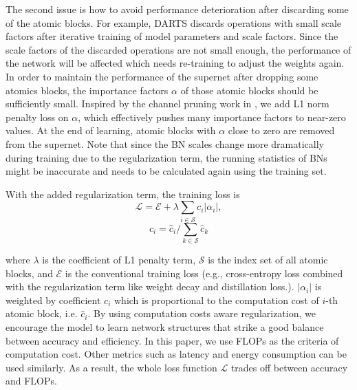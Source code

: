 \documentclass{article} \usepackage{iclr2020_conference,times}
\newcommand{\flops}{FLOPs\xspace}
\begin{document}
The second issue is how to avoid performance deterioration after discarding some of the atomic blocks. For example, DARTS discards operations with small scale factors after iterative training of model parameters and scale factors. Since the scale factors of the discarded operations are not small enough, the performance of the network will be affected which needs re-training to adjust the weights again. In order to maintain the performance of the supernet after dropping some atomics blocks, the importance factors $\alpha$ of those atomic blocks should be sufficiently small. Inspired by the channel pruning work in \cite{zhuang2017slimming}, we add L1 norm penalty loss on $\alpha$, which effectively pushes many importance factors to near-zero values. At the end of learning, atomic blocks with $\alpha$ close to zero are removed from the supernet. Note that since the BN scales change more dramatically during training due to the regularization term, the running statistics of BNs might be inaccurate and needs to be calculated again using the training set.

With the added regularization term, the training loss is
\begin{equation}
    \mathcal{L} = \mathcal{E} + \lambda \sum_{i\in\mathcal{S}} c_i |\alpha_i|, \label{eq:sparsity}
\end{equation}
\begin{equation}
    c_i = \hat{c}_i / \sum_{k \in \mathcal{S}} \hat{c}_k
\end{equation}

where $\lambda$ is the coefficient of L1 penalty term, $\mathcal{S}$ is the index set of all atomic blocks, and $\mathcal{E}$ is the conventional training loss (e.g., cross-entropy loss combined with 
the regularization term like weight decay and distillation loss.). $|\alpha_i|$ is weighted by coefficient $c_i$ which is proportional to the computation cost of $i$-th atomic block, i.e. $\hat{c}_i$. By using computation costs aware regularization, we encourage the model to learn network structures that strike a good balance between accuracy and efficiency.  In this paper, we use FLOPs as the criteria of computation cost. Other metrics such as latency and energy consumption can be used similarly. As a result, the whole loss function $\mathcal{L}$ trades off between accuracy and \flops.
\end{document}
